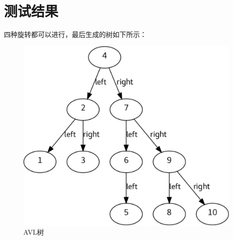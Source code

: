\section{测试结果}
四种旋转都可以进行，最后生成的树如下所示：

\begin{figure}[H]
    \centering
    \includegraphics[width=0.7\linewidth]{figures/Tree}
    \caption{AVL树}
    \label{fig:tree}
\end{figure}
